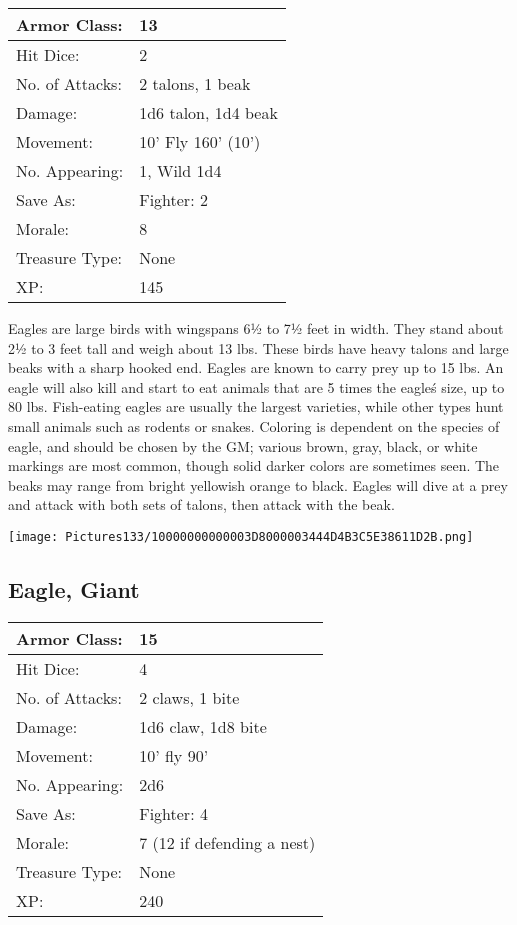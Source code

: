 \documentclass[a4paper,twoside,openany,10pt]{book}
\begin{document}
\begin{multicols}{2}
\begin{tabularx}{0.48\textwidth}{@{}lX@{}}
Armor Class: & 13 \\\hline
Hit Dice: & 2 \\\hline
No. of Attacks: & 2 talons, 1 beak \\\hline
Damage: & 1d6 talon, 1d4 beak \\\hline
Movement: & 10' Fly 160' (10') \\\hline
No. Appearing: & 1, Wild 1d4 \\\hline
Save As: & Fighter: 2 \\\hline
Morale: & 8 \\\hline
Treasure Type: & None \\\hline
XP: & 145 \\\hline
\end{tabularx}\medskip

Eagles are large birds with wingspans 6½ to 7½ feet in width. They stand about 2½ to 3 feet tall and weigh about 13 lbs. These birds have heavy talons and large beaks with a sharp hooked end. Eagles are known to carry prey up to 15 lbs. An eagle will also kill and start to eat animals that are 5 times the eagle\'s size, up to 80 lbs. Fish-eating eagles are usually the largest varieties, while other types hunt small animals such as rodents or snakes. Coloring is dependent on the species of eagle, and should be chosen by the GM; various brown, gray, black, or white markings are most common, though solid darker colors are sometimes seen. The beaks may range from bright yellowish orange to black. Eagles will dive at a prey and attack with both sets of talons, then attack with the beak.

\begin{center}
	\texttt{[image: Pictures133/10000000000003D8000003444D4B3C5E38611D2B.png]}
\end{center}

\subsection*{Eagle, Giant}\label{eagle-giant}

\begin{tabularx}{0.48\textwidth}{@{}lX@{}}
Armor Class: & 15 \\\hline
Hit Dice: & 4 \\\hline
No. of Attacks: & 2 claws, 1 bite \\\hline
Damage: & 1d6 claw, 1d8 bite \\\hline
Movement: & 10' fly 90' \\\hline
No. Appearing: & 2d6 \\\hline
Save As: & Fighter: 4 \\\hline
Morale: & 7 (12 if defending a nest) \\\hline
Treasure Type: & None \\\hline
XP: & 240 \\\hline
\end{tabularx}\medskip


\end{multicols}
\end{document}
